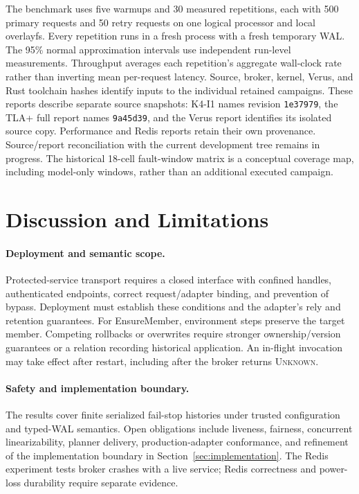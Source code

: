 \documentclass[acmsmall,screen,review,anonymous]{acmart}
\newcommand{\Unknown}{\textsc{Unknown}\xspace}
\begin{document}
The benchmark uses five warmups and 30 measured repetitions, each with
500 primary requests and 50 retry requests on one logical processor and
local overlayfs. Every repetition runs in a fresh process with a fresh
temporary WAL. The 95\% normal approximation intervals use independent
run-level measurements. Throughput averages each repetition's aggregate
wall-clock rate rather than inverting mean per-request latency. Source,
broker, kernel, Verus, and Rust toolchain hashes identify inputs to the
individual retained campaigns. These reports describe separate source
snapshots: K4-I1 names revision \texttt{1e37979},
the TLA+ full report names \texttt{9a45d39}, and the Verus report identifies
its isolated source copy. Performance and Redis reports retain their own
provenance. Source/report reconciliation with the current development tree
remains in progress. The historical 18-cell
fault-window matrix is a conceptual coverage map, including model-only
windows, rather than an additional executed campaign.

\section{Discussion and Limitations}
\label{sec:limitations}

\paragraph{Deployment and semantic scope.}
Protected-service transport requires a closed interface with confined
handles, authenticated endpoints, correct request/adapter binding, and
prevention of bypass. Deployment must establish these conditions and the
adapter's rely and retention guarantees. For EnsureMember, environment
steps preserve the target member. Competing rollbacks or overwrites require
stronger ownership/version guarantees or a relation recording historical
application. An in-flight invocation may take effect after restart,
including after the broker returns \Unknown.

\paragraph{Safety and implementation boundary.}
The results cover finite serialized fail-stop histories under trusted
configuration and typed-WAL semantics. Open obligations include liveness,
fairness, concurrent linearizability, planner delivery, production-adapter
conformance, and refinement of the implementation boundary in
Section~\ref{sec:implementation}. The Redis experiment tests broker crashes
with a live service; Redis correctness and power-loss durability require
separate evidence.
\end{document}
